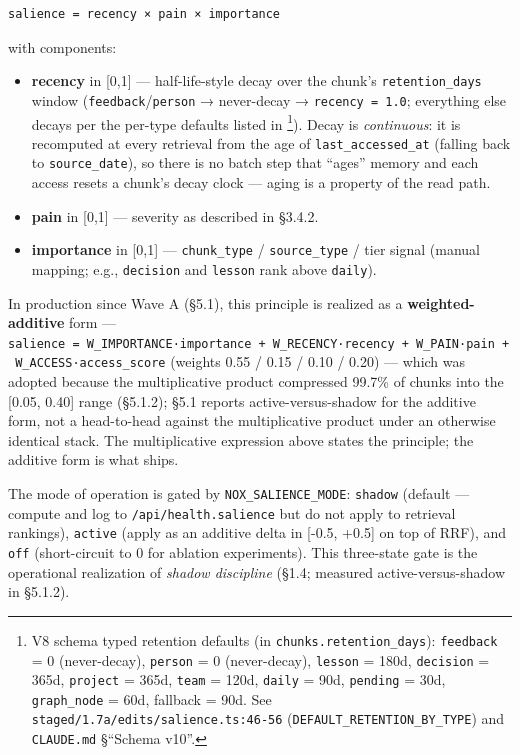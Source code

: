 \documentclass[
]{article}
\providecommand{\tightlist}{%
  \setlength{\itemsep}{0pt}\setlength{\parskip}{0pt}}
\begin{document}
\begin{verbatim}
salience = recency × pain × importance
\end{verbatim}

with components:

\begin{itemize}
\tightlist
\item
  \textbf{recency} in {[}0,1{]} --- half-life-style decay over the
  chunk's \texttt{retention\_days} window
  (\texttt{feedback}/\texttt{person} → never-decay →
  \texttt{recency\ =\ 1.0}; everything else decays per the per-type
  defaults listed in \footnote{V8 schema typed retention defaults (in
    \texttt{chunks.retention\_days}): \texttt{feedback} = 0
    (never-decay), \texttt{person} = 0 (never-decay), \texttt{lesson} =
    180d, \texttt{decision} = 365d, \texttt{project} = 365d,
    \texttt{team} = 120d, \texttt{daily} = 90d, \texttt{pending} = 30d,
    \texttt{graph\_node} = 60d, fallback = 90d. See
    \texttt{staged/1.7a/edits/salience.ts:46-56}
    (\texttt{DEFAULT\_RETENTION\_BY\_TYPE}) and \texttt{CLAUDE.md}
    §``Schema v10''.}). Decay is \emph{continuous}: it is recomputed at
  every retrieval from the age of \texttt{last\_accessed\_at} (falling
  back to \texttt{source\_date}), so there is no batch step that
  ``ages'' memory and each access resets a chunk's decay clock --- aging
  is a property of the read path.
\item
  \textbf{pain} in {[}0,1{]} --- severity as described in §3.4.2.
\item
  \textbf{importance} in {[}0,1{]} --- \texttt{chunk\_type} /
  \texttt{source\_type} / tier signal (manual mapping; e.g.,
  \texttt{decision} and \texttt{lesson} rank above \texttt{daily}).
\end{itemize}

In production since Wave A (§5.1), this principle is realized as a
\textbf{weighted-additive} form ---
\texttt{salience\ =\ W\_IMPORTANCE·importance\ +\ W\_RECENCY·recency\ +\ W\_PAIN·pain\ +\ W\_ACCESS·access\_score}
(weights 0.55 / 0.15 / 0.10 / 0.20) --- which was adopted because the
multiplicative product compressed 99.7\% of chunks into the {[}0.05,
0.40{]} range (§5.1.2); §5.1 reports active-versus-shadow for the
additive form, not a head-to-head against the multiplicative product
under an otherwise identical stack. The multiplicative expression above
states the principle; the additive form is what ships.

The mode of operation is gated by \texttt{NOX\_SALIENCE\_MODE}:
\texttt{shadow} (default --- compute and log to
\texttt{/api/health.salience} but do not apply to retrieval rankings),
\texttt{active} (apply as an additive delta in {[}-0.5, +0.5{]} on top
of RRF), and \texttt{off} (short-circuit to 0 for ablation experiments).
This three-state gate is the operational realization of \emph{shadow
discipline} (§1.4; measured active-versus-shadow in §5.1.2).
\end{document}
